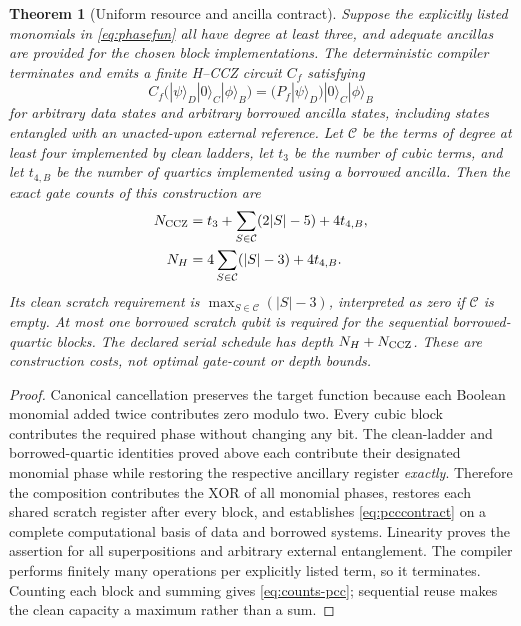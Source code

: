 \documentclass[11pt,a4paper]{article}
\newtheorem{theorem}{Theorem}
\begin{document}
\begin{theorem}[Uniform resource and ancilla contract]
\label{thm:pcc}
Suppose the explicitly listed monomials in
\eqref{eq:phasefun} all have degree at least three,
and adequate ancillas are provided for the
chosen block implementations. The deterministic
compiler terminates and emits a finite
H--CCZ circuit $C_f$ satisfying
\begin{equation}\label{eq:pcccontract}
C_f\bigl(|\psi\rangle_D|0\rangle_C|\phi\rangle_B\bigr)
=(P_f|\psi\rangle_D)|0\rangle_C|\phi\rangle_B
\end{equation}
for arbitrary data states and arbitrary borrowed
ancilla states, including states entangled with
an unacted-upon external reference.
Let $\mathcal C$ be the terms of degree at
least four implemented by clean ladders,
let $t_3$ be the number of cubic terms,
and let $t_{4,B}$ be the number of quartics
implemented using a borrowed ancilla. Then
the exact gate counts of this construction are
\begin{equation}\label{eq:counts-pcc}
\begin{aligned}
N_{\rm CCZ}&=t_3+
\sum_{S\in\mathcal C}(2|S|-5)+4t_{4,B},\\
N_H&=4\sum_{S\in\mathcal C}(|S|-3)+4t_{4,B}.
\end{aligned}
\end{equation}
Its clean scratch requirement is
$\max_{S\in\mathcal C}(|S|-3)$, interpreted
as zero if $\mathcal C$ is empty.
At most one borrowed scratch qubit is required
for the sequential borrowed-quartic blocks.
The declared serial schedule has depth
$N_H+N_{\rm CCZ}$. These are construction
costs, not optimal gate-count or depth bounds.
\end{theorem}
\begin{proof}
Canonical cancellation preserves the target
function because each Boolean monomial added
twice contributes zero modulo two. Every
cubic block contributes the required phase
without changing any bit. The clean-ladder
and borrowed-quartic identities proved
above each contribute their designated
monomial phase while restoring the
respective ancillary register \emph{exactly}.
Therefore the composition contributes
the XOR of all monomial phases, restores
each shared scratch register after every
block, and establishes \eqref{eq:pcccontract}
on a complete computational basis of
data and borrowed systems. Linearity proves
the assertion for all superpositions and
arbitrary external entanglement.
The compiler performs finitely many
operations per explicitly listed term,
so it terminates. Counting each block
and summing gives \eqref{eq:counts-pcc};
sequential reuse makes the clean capacity
a maximum rather than a sum.
\end{proof}
\end{document}
